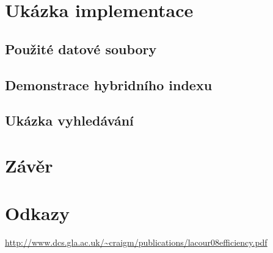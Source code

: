 \documentclass[11pt]{article}
\begin{document}
\section{Ukázka implementace}
\subsection{Použité datové soubory}
\subsection{Demonstrace hybridního indexu}
\subsection{Ukázka vyhledávání}


\section{Závěr}

\section{Odkazy}
\url{http://www.dcs.gla.ac.uk/~craigm/publications/lacour08efficiency.pdf}


\end{document}
